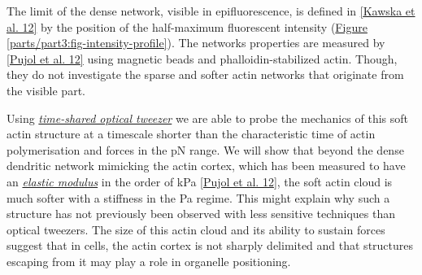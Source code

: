 \documentclass[A4paperpaper,11pt,english]{sphinxmanual}
\begin{document}
The limit of the dense network, visible in epifluorescence, is defined in
{\hyperref[parts/part3:kawska2012]{{[}Kawska et al. 12{]}}} by the position of the half-maximum fluorescent intensity (\hyperref[parts/part3:fig-intensity-profile]{Figure  \ref*{parts/part3:fig-intensity-profile}}).
The networks properties are measured by {\hyperref[parts/part3:pujol2012]{{[}Pujol et al. 12{]}}} using
magnetic beads and phalloidin-stabilized actin. Though, they do not
investigate the sparse and softer actin networks that originate from the visible
part.

Using {\hyperref[parts/part2:time-shared-ot]{\emph{time-shared optical tweezer}}} we are able to probe
the mechanics of this soft actin structure at a timescale shorter than the
characteristic time of actin polymerisation and forces in the pN range. We will show
that beyond the dense dendritic network mimicking the actin cortex, which has
been measured to have an {\hyperref[parts/part1:elastic-modulus]{\emph{elastic modulus}}} in the order of
kPa {\hyperref[parts/part3:pujol2012]{{[}Pujol et al. 12{]}}}, the soft actin cloud is much softer with
a stiffness in the Pa regime.  This might explain why such a
structure has not previously been observed with less sensitive techniques than optical
tweezers. The size of this actin cloud and its ability to sustain forces
suggest that in cells, the actin cortex is not sharply delimited and that
structures escaping from it may play a role in organelle positioning.
\end{document}

